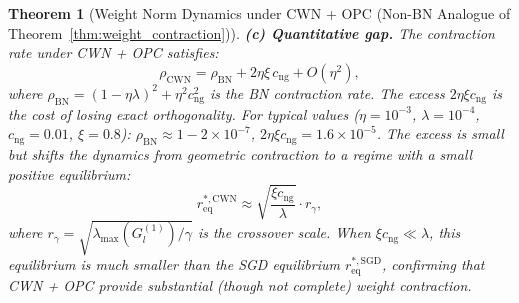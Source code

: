\documentclass{article}
\theoremstyle{plain}
\newtheorem{theorem}{Theorem}
\theoremstyle{definition}
\theoremstyle{remark}
\begin{document}
\begin{theorem}[Weight Norm Dynamics under CWN + OPC (Non-BN Analogue of Theorem~\ref{thm:weight_contraction})]
\textbf{(c) Quantitative gap.} The contraction rate under CWN + OPC satisfies:
\begin{equation}
    \rho_{\mathrm{CWN}} = \rho_{\mathrm{BN}} + 2\eta\xi\,c_{\mathrm{ng}} + O(\eta^2),
\end{equation}
where $\rho_{\mathrm{BN}} = (1-\eta\lambda)^2 + \eta^2 c_{\mathrm{ng}}^2$ is the BN contraction rate. The excess $2\eta\xi c_{\mathrm{ng}}$ is the cost of losing exact orthogonality. For typical values ($\eta = 10^{-3}$, $\lambda = 10^{-4}$, $c_{\mathrm{ng}} = 0.01$, $\xi = 0.8$): $\rho_{\mathrm{BN}} \approx 1 - 2\times10^{-7}$, $2\eta\xi c_{\mathrm{ng}} = 1.6\times10^{-5}$. The excess is small but shifts the dynamics from geometric contraction to a regime with a \emph{small positive equilibrium}:
\begin{equation}
    r_{\mathrm{eq}}^{*,\mathrm{CWN}} \approx \sqrt{\frac{\xi c_{\mathrm{ng}}}{\lambda}} \cdot r_\gamma,
\end{equation}
where $r_\gamma = \sqrt{\lambda_{\max}(G_l^{(1)})/\gamma}$ is the crossover scale. When $\xi c_{\mathrm{ng}} \ll \lambda$, this equilibrium is much smaller than the SGD equilibrium $r_{\mathrm{eq}}^{*,\mathrm{SGD}}$, confirming that CWN + OPC provide substantial (though not complete) weight contraction.
\end{theorem}
\end{document}
